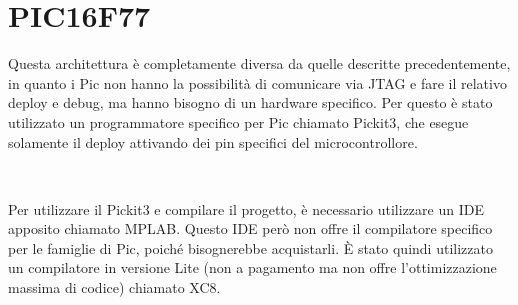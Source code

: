 \documentclass[a4paper,titlepage]{book}
\begin{document}
\section{PIC16F77}

Questa architettura è completamente diversa da quelle descritte precedentemente, in quanto i Pic non hanno la possibilità di comunicare via JTAG e fare il relativo deploy e debug, ma hanno bisogno di un hardware specifico. Per questo è stato utilizzato un programmatore specifico per Pic chiamato Pickit3, che esegue solamente il deploy attivando dei pin specifici del microcontrollore.

~

Per utilizzare il Pickit3 e compilare il progetto, è necessario utilizzare un IDE apposito chiamato MPLAB. Questo IDE però non offre il compilatore specifico per le famiglie di Pic, poiché bisognerebbe acquistarli. È stato quindi utilizzato un compilatore in versione Lite (non a pagamento ma non offre l'ottimizzazione massima di codice) chiamato XC8. 
\end{document}
